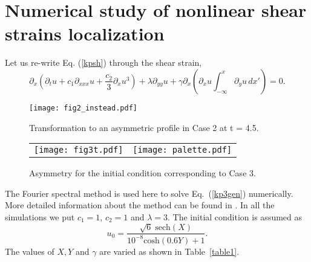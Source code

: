 \section{Numerical study of nonlinear shear strains localization}
Let us re-write Eq. (\ref{kpsh}) through the shear strain, 
\begin{equation}
	\label{kp3gen}
	\partial_x\left(\partial_t u+c_1 \partial_{xxx} u+\frac{c_2 }{3}\partial_x u^{3}\right)+\lambda \partial_{yy} u+\gamma \partial_x\left(\partial_x u \int_{-\infty}^x \partial_y u \, dx'\right)=0.
\end{equation}
\begin{figure}
	\begin{center}
		\texttt{[image: fig2\_instead.pdf]} 
		\caption{Transformation to an asymmetric profile in Case 2 at t = 4.5.}\label{fig2}
	\end{center}
\end{figure}
\begin{figure}
	\begin{center}
		\begin{tabular}{cc}
			\texttt{[image: fig3t.pdf]} & \texttt{[image: palette.pdf]}
		\end{tabular}
		\caption{Asymmetry for the initial condition corresponding to Case 3.}\label{fig3}
	\end{center}
\end{figure}
The Fourier spectral method is used here to solve Eq.~(\ref{kp3gen}) numerically. More detailed information about the method can be found in \cite{poosan20}.
In all the simulations we put $c_1 = 1$, $c_2 = 1$ and $\lambda = 3$. The initial condition is assumed as
\begin{equation}\label{init}
	u_0 = \frac{\sqrt{6}\;\mathrm{sech}(X)}{10^{-8} \mathrm
		{cosh} (0.6 Y)+1}.
\end{equation}
The values of $X, Y$ and $\gamma$ are varied as shown in Table~\ref{table1}.

